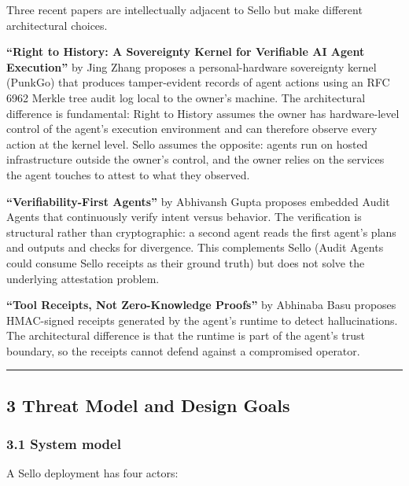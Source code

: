 \documentclass[
  11pt,
]{article}
\begin{document}
Three recent papers are intellectually adjacent to Sello but make
different architectural choices.

\textbf{``Right to History: A Sovereignty Kernel for Verifiable AI Agent
Execution''} by Jing Zhang \citep{zhang-righttohistory} proposes a
personal-hardware sovereignty kernel (PunkGo) that produces
tamper-evident records of agent actions using an RFC 6962 Merkle tree
audit log local to the owner's machine. The architectural difference is
fundamental: Right to History assumes the owner has hardware-level
control of the agent's execution environment and can therefore observe
every action at the kernel level. Sello assumes the opposite: agents run
on hosted infrastructure outside the owner's control, and the owner
relies on the services the agent touches to attest to what they
observed.

\textbf{``Verifiability-First Agents''} by Abhivansh Gupta
\citep{gupta-verifiabilityfirst} proposes embedded Audit Agents that
continuously verify intent versus behavior. The verification is
structural rather than cryptographic: a second agent reads the first
agent's plans and outputs and checks for divergence. This complements
Sello (Audit Agents could consume Sello receipts as their ground truth)
but does not solve the underlying attestation problem.

\textbf{``Tool Receipts, Not Zero-Knowledge Proofs''} by Abhinaba Basu
\citep{basu-toolreceipts} proposes HMAC-signed receipts generated by the
agent's runtime to detect hallucinations. The architectural difference
is that the runtime is part of the agent's trust boundary, so the
receipts cannot defend against a compromised operator.

\begin{center}\rule{0.5\linewidth}{0.5pt}\end{center}

\hypertarget{threat-model-and-design-goals}{%
\subsection{3 Threat Model and Design
Goals}\label{threat-model-and-design-goals}}

\hypertarget{system-model}{%
\subsubsection{3.1 System model}\label{system-model}}

A Sello deployment has four actors:
\end{document}
